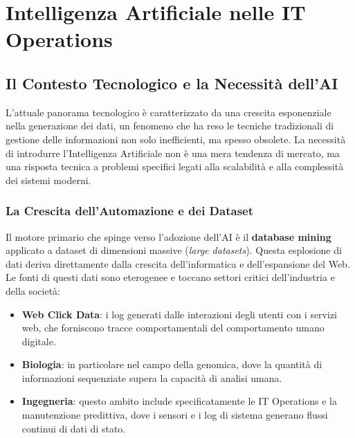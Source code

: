 \section{Intelligenza Artificiale nelle IT Operations}

\subsection{Il Contesto Tecnologico e la Necessità dell'AI}

L'attuale panorama tecnologico è caratterizzato da una crescita
esponenziale nella generazione dei dati, un fenomeno che ha reso le
tecniche tradizionali di gestione delle informazioni non solo
inefficienti, ma spesso obsolete. La necessità di introdurre
l'Intelligenza Artificiale non è una mera tendenza di mercato, ma una
risposta tecnica a problemi specifici legati alla scalabilità e alla
complessità dei sistemi moderni.

\subsubsection{La Crescita dell'Automazione e dei Dataset}

Il motore primario che spinge verso l'adozione dell'AI è il
\textbf{database mining} applicato a dataset di dimensioni massive
(\textit{large datasets}). Questa esplosione di dati deriva direttamente
dalla crescita dell'informatica e dell'espansione del Web. Le fonti di
questi dati sono eterogenee e toccano settori critici dell'industria e
della società:

\begin{itemize}
    \item \textbf{Web Click Data}: i log generati dalle interazioni
    degli utenti con i servizi web, che forniscono tracce
    comportamentali del comportamento umano digitale.
    \item \textbf{Biologia}: in particolare nel campo della genomica,
    dove la quantità di informazioni sequenziate supera la capacità di
    analisi umana.
    \item \textbf{Ingegneria}: questo ambito include specificatamente le
    IT Operations e la manutenzione predittiva, dove i sensori e i log
    di sistema generano flussi continui di dati di stato.
\end{itemize}

